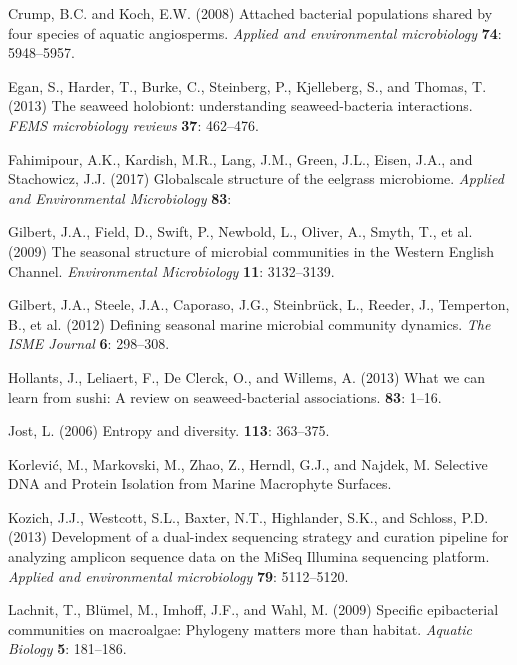 \documentclass[12pt,]{article}
\begin{document}
\leavevmode\hypertarget{ref-Crump2008}{}%
Crump, B.C. and Koch, E.W. (2008) Attached bacterial populations shared
by four species of aquatic angiosperms. \emph{Applied and environmental
microbiology} \textbf{74}: 5948--5957.

\leavevmode\hypertarget{ref-Egan2013}{}%
Egan, S., Harder, T., Burke, C., Steinberg, P., Kjelleberg, S., and
Thomas, T. (2013) The seaweed holobiont: understanding seaweed-bacteria
interactions. \emph{FEMS microbiology reviews} \textbf{37}: 462--476.

\leavevmode\hypertarget{ref-Fahimipour2017}{}%
Fahimipour, A.K., Kardish, M.R., Lang, J.M., Green, J.L., Eisen, J.A.,
and Stachowicz, J.J. (2017) Globalscale structure of the eelgrass
microbiome. \emph{Applied and Environmental Microbiology} \textbf{83}:

\leavevmode\hypertarget{ref-Gilbert2009}{}%
Gilbert, J.A., Field, D., Swift, P., Newbold, L., Oliver, A., Smyth, T.,
et al. (2009) The seasonal structure of microbial communities in the
Western English Channel. \emph{Environmental Microbiology} \textbf{11}:
3132--3139.

\leavevmode\hypertarget{ref-Gilbert2012}{}%
Gilbert, J.A., Steele, J.A., Caporaso, J.G., Steinbrück, L., Reeder, J.,
Temperton, B., et al. (2012) Defining seasonal marine microbial
community dynamics. \emph{The ISME Journal} \textbf{6}: 298--308.

\leavevmode\hypertarget{ref-Hollants2013}{}%
Hollants, J., Leliaert, F., De Clerck, O., and Willems, A. (2013) What
we can learn from sushi: A review on seaweed-bacterial associations.
\textbf{83}: 1--16.

\leavevmode\hypertarget{ref-Jost2006}{}%
Jost, L. (2006) Entropy and diversity. \textbf{113}: 363--375.

\leavevmode\hypertarget{ref-Korlevic_in_press}{}%
Korlević, M., Markovski, M., Zhao, Z., Herndl, G.J., and Najdek, M.
Selective DNA and Protein Isolation from Marine Macrophyte Surfaces.

\leavevmode\hypertarget{ref-Kozich2013}{}%
Kozich, J.J., Westcott, S.L., Baxter, N.T., Highlander, S.K., and
Schloss, P.D. (2013) Development of a dual-index sequencing strategy and
curation pipeline for analyzing amplicon sequence data on the MiSeq
Illumina sequencing platform. \emph{Applied and environmental
microbiology} \textbf{79}: 5112--5120.

\leavevmode\hypertarget{ref-Lachnit2009}{}%
Lachnit, T., Blümel, M., Imhoff, J.F., and Wahl, M. (2009) Specific
epibacterial communities on macroalgae: Phylogeny matters more than
habitat. \emph{Aquatic Biology} \textbf{5}: 181--186.
\end{document}
